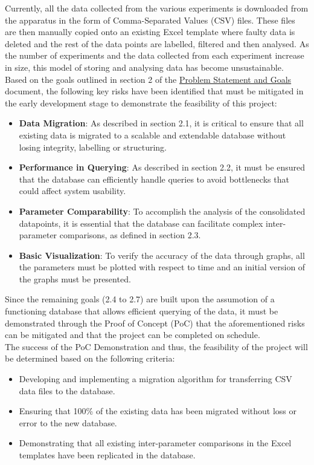 \documentclass{article}
\begin{document}
Currently, all the data collected from the various experiments is downloaded from the 
apparatus in the form of Comma-Separated Values (CSV) files. These files are then manually
copied onto an existing Excel template where faulty data is deleted and the rest of the data points
are labelled, filtered and then analysed. As the number of experiments and the data collected
from each experiment increase in size, this model of storing and analysing data has
become unsustainable.\\
\newline
\noindent Based on the goals outlined in section 2 of the \href{https://github.com/SumanyaG/Alkalytics/blob/6efc4b2a5f37f2309be86f1e1bfc49c1ddfd097d/docs/ProblemStatementAndGoals/ProblemStatement.pdf}{Problem Statement and Goals} document,
the following key risks have been identified that must be mitigated in the early development
stage to demonstrate the feasibility of this project:
\begin{itemize}
  \item \textbf{Data Migration}: As described in section 2.1, it is critical to ensure that all existing 
  data is migrated to a scalable and extendable database without losing integrity, labelling or structuring.
  \item \textbf{Performance in Querying}: As described in section 2.2, it must be ensured that the database can 
  efficiently handle queries to avoid bottlenecks that could affect system usability.
  \item \textbf{Parameter Comparability}: To accomplish the analysis of the consolidated datapoints, it is essential
  that the database can facilitate complex inter-parameter comparisons, as defined in section 2.3.
  \item \textbf{Basic Visualization}: To verify the accuracy of the data through graphs, all the parameters must 
  be plotted with respect to time and an initial version of the graphs must be presented.
\end{itemize}

\noindent Since the remaining goals (2.4 to 2.7) are built upon the assumotion of a functioning database that 
allows efficient querying of the data, it must be demonstrated through the Proof of Concept (PoC) that the aforementioned
risks can be mitigated and that the project can be completed on schedule.\\
\newline
\noindent The success of the PoC Demonstration and thus, the feasibility of the project will be determined based 
on the following criteria:
\begin{itemize}
  \item Developing and implementing a migration algorithm for transferring CSV data files to the database. 
  \item Ensuring that 100\% of the existing data has been migrated without loss or error to the new database.
  \item Demonstrating that all existing inter-parameter comparisons in the Excel templates have been replicated in the database.
\end{itemize}
\end{document}
